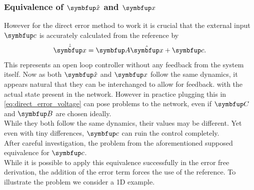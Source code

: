 \subsubsection{Equivalence of $\bmu{\hat{x}}$ and $\bmu{x}$}
However for the direct error method to work it is crucial that the external input $\bmu{c}$ is accurately calculated from the reference by
\begin{equation}
	\dot{\hat{\bmu{x}}} = \bmu{A}\hat{\bmu{x}} + \bmu{c}.
\end{equation}
This represents an open loop controller without any feedback from the system itself.
Now as both $\bmu{\hat{x}}$ and $\bmu{x}$ follow the same dynamics, it appears natural that they can be interchanged to allow for feedback. with the actual state present in the network. However in practice plugging this in \cref{eq:direct_error_voltage} can pose problems to the network, even if $\bmu{C}$ and $\bmu{B}$ are chosen ideally.\\
While they both follow the same dynamics, their values may be different. Yet even with tiny differences, $\bmu{c}$ can ruin the control completely.\\
After careful investigation, the problem from the aforementioned supposed equivalence for $\bmu{c}$.\\
While it is possible to apply this equivalence successfully in the error free derivation, the addition of the error term forces the use of the reference.
To illustrate the problem we consider a 1D example.
